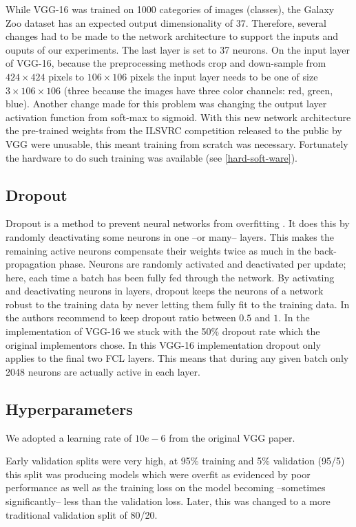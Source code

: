 While VGG-16 was trained on 1000 categories of images (classes), the Galaxy Zoo dataset has an expected output dimensionality of 37. Therefore, several changes had to be made to the network architecture to support the inputs and ouputs of our experiments. The last layer is set to 37 neurons. On the input layer of VGG-16, because the preprocessing methods crop and down-sample from $424 \times 424$ pixels to $106 \times 106$ pixels the input layer needs to be one of size $3 \times 106 \times 106$ (three because the images have three color channels: red, green, blue). Another change made for this problem was changing the output layer activation function from soft-max to sigmoid. With this new network architecture the pre-trained weights from the ILSVRC competition released to the public by VGG were unusable, this meant training from scratch was necessary. Fortunately the hardware to do such training was available (see \ref{hard-soft-ware}).

\subsection{Dropout}
Dropout is a method to prevent neural networks from overfitting \cite{dropout}. It does this by randomly deactivating some neurons in one --or many-- layers. This makes the remaining active neurons compensate their weights twice as much in the back-propagation phase. Neurons are randomly activated and deactivated per update; here, each time a batch has been fully fed through the network. By activating and deactivating neurons in layers, dropout keeps the neurons of a network robust to the training data by never letting them fully fit to the training data. In \cite{dropout} the authors recommend to keep dropout ratio between $0.5$ and $1$. In the implementation of VGG-16 we stuck with the 50\% dropout rate which the original implementors chose. In this VGG-16 implementation dropout only applies to the final two FCL layers. This means that during any given batch only 2048 neurons are actually active in each layer.

\subsection{Hyperparameters}

We adopted a learning rate of $10e-6$ from the original VGG paper.

Early validation splits were very high, at 95\% training and 5\% validation (95/5) this split was producing models which were overfit as evidenced by poor performance as well as the training loss on the model becoming --sometimes significantly-- less than the validation loss. Later, this was changed to a more traditional validation split of 80/20.

